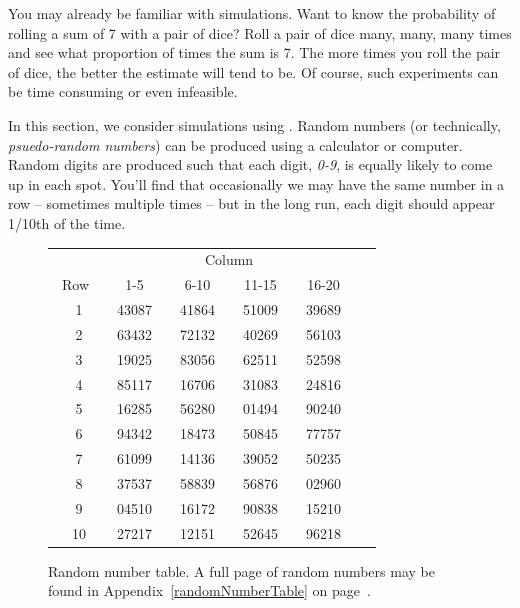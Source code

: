 You may already be familiar with simulations. Want to know the probability of rolling a sum of 7 with a pair of dice?  Roll a pair of dice many, many, many times and see what proportion of times the sum is 7. The more times you roll the pair of dice, the better the estimate will tend to be. Of course, such experiments can be time consuming or even infeasible.

In this section, we consider simulations using . Random numbers (or technically, \emph{psuedo-random numbers}) can be produced using a calculator or computer. Random digits are produced such that each digit, \emph{0-9}, is equally likely to come up in each spot. You'll find that occasionally we may have the same number in a row -- sometimes multiple times -- but in the long run, each digit should appear 1/10th of the time.

\begin{figure}[h]
\centering
\begin{tabular}{cc cc cc cc cc}
& \multicolumn{7}{c}{Column} \\
  \cline{2-8}
\quad\ Row\quad\ \  & 1-5 && 6-10 && 11-15 && 16-20 \\
  \hline
1 & 43087 & \quad & 41864 & \quad & 51009 & \quad & 39689 \\
2 & 63432 & \quad & 72132 & \quad & 40269 & \quad & 56103 \\
3 & 19025 & \quad & 83056 & \quad & 62511 & \quad & 52598 \\
4 & 85117 & \quad & 16706 & \quad & 31083 & \quad & 24816 \\
5 & 16285 & \quad & 56280 & \quad & 01494 & \quad & 90240 \\
  \hline
6 & 94342 & \quad & 18473 & \quad & 50845 & \quad & 77757 \\
7 & 61099 & \quad & 14136 & \quad & 39052 & \quad & 50235 \\
8 & 37537 & \quad & 58839 & \quad & 56876 & \quad & 02960 \\
9 & 04510 & \quad & 16172 & \quad & 90838 & \quad & 15210 \\
10 & 27217 & \quad & 12151 & \quad & 52645 & \quad & 96218 \\
  \hline
\end{tabular}
\caption{Random number table. A full page of random numbers may be found in Appendix~\ref{randomNumberTable} on page~\pageref{randomNumberTable}.}
\label{sampleRandomNumberTable}
\end{figure}

